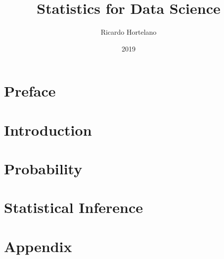 \documentclass[12pt]{book}
\title{
{Statistics for Data Science}\\
}
\author{Ricardo Hortelano}
\date{2019}
\begin{document}
\maketitle
\tableofcontents

\chapter*{Preface}


\chapter{Introduction}


\chapter{Probability}


\chapter{Statistical Inference}


\appendix
\chapter{Appendix}


\printbibliography
\end{document}

